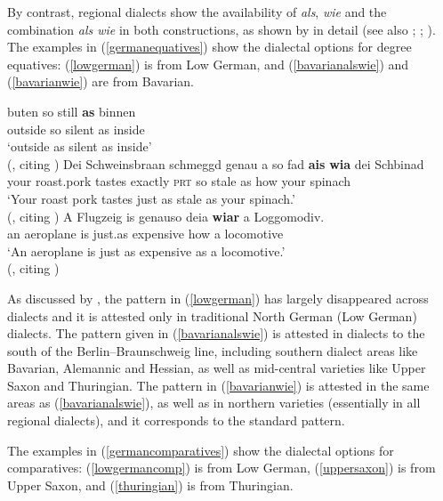 By contrast, regional dialects show the availability of \textit{als}, \textit{wie} and the combination \textit{als wie} in both constructions, as shown by \citet{jaeger2018} in detail (see also \citealt{eggs2006}; \citealt{lipold1983}; \citealt{weise1918}). The examples in (\ref{germanequatives}) show the dialectal options for degree equatives: (\ref{lowgerman}) is from Low German, and (\ref{bavarianalswie}) and (\ref{bavarianwie}) are from Bavarian. 

\ea \label{germanequatives}
\ea \gll buten so still \textbf{as} binnen \label{lowgerman}\\
outside so silent as inside\\
\glt `outside as silent as inside'\\(\citealt[327, ex. 530a]{jaeger2018}, citing \citealt[170]{weise1918})
\ex \gll Dei Schweinsbraan schmeggd genau a so fad \textbf{ais} \textbf{wia} dei Schbinad \label{bavarianalswie}\\
your roast.pork tastes exactly \textsc{prt} so stale as how your spinach\\
\glt `Your roast pork tastes just as stale as your spinach.'\\(\citealt[327, ex. 531a]{jaeger2018}, citing \citealt[171]{merkle1975})
\ex \gll A Flugzeig is genauso deia \textbf{wiar} a Loggomodiv. \label{bavarianwie}\\
an aeroplane is just.as expensive how a locomotive\\
\glt `An aeroplane is just as expensive as a locomotive.'\\(\citealt[326, ex. 529a]{jaeger2018}, citing \citealt[171]{merkle1975})
\z
\z

As discussed by \citet{jaeger2018}, the pattern in (\ref{lowgerman}) has largely disappeared across dialects and it is attested only in traditional North German (Low German) dialects. The pattern given in (\ref{bavarianalswie}) is attested in dialects to the south of the Berlin--Braunschweig line, including southern dialect areas like Bavarian, Alemannic and Hessian, as well as mid-central varieties like Upper Saxon and Thuringian. The pattern in (\ref{bavarianwie}) is attested in the same areas as (\ref{bavarianalswie}), as well as in northern varieties (essentially in all regional dialects), and it corresponds to the standard pattern.

The examples in (\ref{germancomparatives}) show the dialectal options for comparatives: (\ref{lowgermancomp}) is from Low German, (\ref{uppersaxon}) is from Upper Saxon, and (\ref{thuringian}) is from Thuringian.

